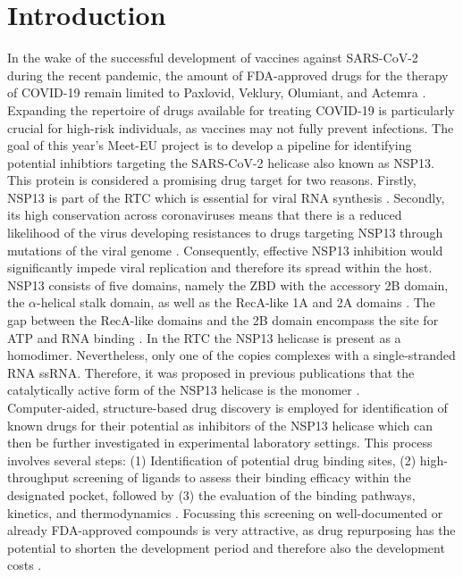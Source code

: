 \documentclass[11pt, letterpaper, titlepage]{article}
\renewcommand{\cite}{\parencite}
\begin{document}
\section{Introduction}
In the wake of the successful development of vaccines against \ac{SARS-CoV-2} during the recent pandemic, the amount of FDA-approved drugs for the therapy of \ac{COVID-19} remain limited to Paxlovid, Veklury, Olumiant, and Actemra \cite{FDACOVID}. Expanding the repertoire of drugs available for treating \ac{COVID-19} is particularly crucial for high-risk individuals, as vaccines may not fully prevent infections. The goal of this year's Meet-EU project is to develop a pipeline for identifying potential inhibtiors targeting the SARS-CoV-2 helicase also known as \ac{NSP13}. 
This protein is considered a promising drug target for two reasons. Firstly, \ac{NSP13} is part of the \ac{RTC} which is essential for viral RNA synthesis \cite{Malone_2022}. Secondly, its high conservation across coronaviruses means that there is a reduced likelihood of the virus developing resistances to drugs targeting \ac{NSP13} through mutations of the viral genome \cite{Spratt_2021}. Consequently, effective \ac{NSP13} inhibition would significantly impede viral replication and therefore its spread within the host. 
\ac{NSP13} consists of five domains, namely the \ac{ZBD} with the accessory 2B domain, the $\alpha$-helical stalk domain, as well as the RecA-like 1A and 2A domains \cite{Marecki}. The gap between the RecA-like domains and the 2B domain encompass the site for ATP and RNA binding \cite{NSP13_basics}. In the \ac{RTC} the NSP13 helicase is present as a homodimer. Nevertheless, only one of the copies complexes with a single-stranded RNA \ac{ssRNA}. Therefore, it was proposed in previous publications that the catalytically active form of the \ac{NSP13} helicase is the monomer \cite{Berta_2021}. \\

\noindent Computer-aided, structure-based drug discovery is employed for identification of known drugs for their potential as inhibitors of the \ac{NSP13} helicase which can then be further investigated in experimental laboratory settings. This process involves several steps: (1) Identification of potential drug binding sites, (2) high-throughput screening of ligands to assess their binding efficacy within the  designated pocket, followed by (3) the evaluation of the binding pathways, kinetics, and thermodynamics \cite{Sledz_2018}. Focussing this screening on well-documented or already FDA-approved compounds is very attractive, as drug repurposing has the potential to shorten the development period and therefore also the development costs \cite{Pushpakom_2019}. 
\end{document}
